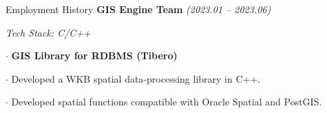 \begin{rubric}{Employment History}
	\quad \textbf{GIS Engine Team} \textit{\small(2023.01 -- 2023.06)}\par
	\textit{\small Tech Stack: C/C++}\par
	\quad $\cdot$ \textbf{GIS Library for RDBMS (Tibero)}\par
	\hangindent=1cm  %
	$\cdot$ Developed a WKB spatial data-processing library in C++.\par
	\hangindent=1cm  %
	$\cdot$ Developed spatial functions compatible with Oracle Spatial and PostGIS.\par

\end{rubric}
